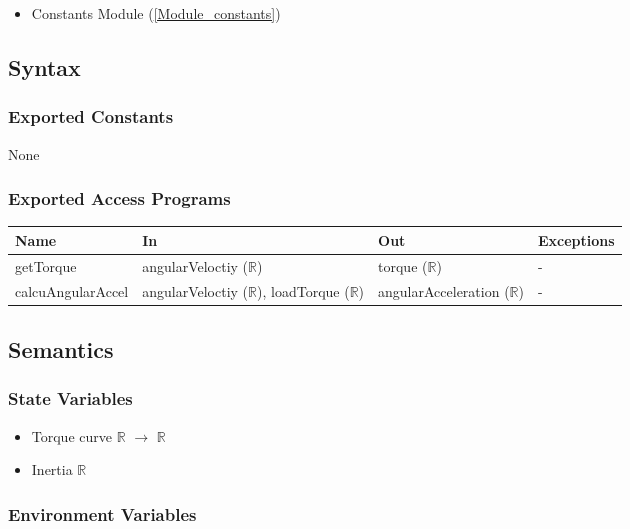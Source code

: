\documentclass[12pt, titlepage]{article}
\begin{document}
\begin{itemize}
  \item Constants Module (\ref{Module_constants})
\end{itemize}

\subsection{Syntax}

\subsubsection{Exported Constants}
None

\subsubsection{Exported Access Programs}

\begin{center}
\begin{tabular}{p{4cm} p{4cm} p{4cm} p{2cm}}
\hline
\textbf{Name} & \textbf{In} & \textbf{Out} & \textbf{Exceptions} \\
\hline
getTorque & angularVeloctiy ($\mathbb{R}$) & torque ($\mathbb{R}$) & - \\
calcuAngularAccel & angularVeloctiy ($\mathbb{R}$), loadTorque ($\mathbb{R}$)  & angularAcceleration ($\mathbb{R}$) & - \\
\hline
\end{tabular}
\end{center}

\subsection{Semantics}

\subsubsection{State Variables}

\begin{itemize}
  \item Torque curve $\mathbb{R}$ $\rightarrow$ $\mathbb{R}$
  \item Inertia $\mathbb{R}$
\end{itemize}

\subsubsection{Environment Variables}
\end{document}
